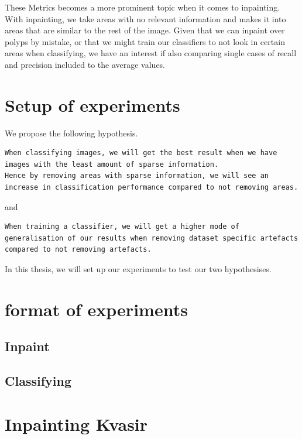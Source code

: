 These Metrics becomes a more prominent topic when it comes to inpainting. With inpainting, we take areas with no relevant information and makes it into areas that are similar to the rest of the image. Given that we can inpaint over polyps by mistake, or that we might train our classifiers to not look in certain areas when classifying, we have an interest if also comparing single cases of recall and precision included to the average values.







\section{Setup of experiments}
We propose the following hypothesis.
\vspace{10px}

\begin{verbatim}
When classifying images, we will get the best result when we have images with the least amount of sparse information. 
Hence by removing areas with sparse information, we will see an increase in classification performance compared to not removing areas.
\end{verbatim}

and

\begin{verbatim}
When training a classifier, we will get a higher mode of generalisation of our results when removing dataset specific artefacts 
compared to not removing artefacts.
\end{verbatim}


In this thesis, we will set up our experiments to test our two hypothesises. 

\section{format of experiments}
    \subsection{Inpaint}
    \subsection{Classifying}
    
\section{Inpainting Kvasir}
